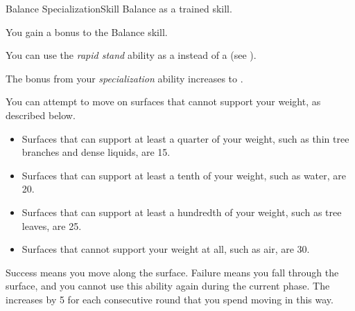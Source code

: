     \begin{feat}{Balance Specialization}{Skill}
        \featpre Balance as a trained skill.

         You gain a  bonus to the Balance skill.

         You can use the \textit{rapid stand} ability as a  instead of a  (see ).

         The bonus from your \textit{specialization} ability increases to .

         You can attempt to move on surfaces that cannot support your weight, as described below.
        \begin{itemize}
            \item Surfaces that can support at least a quarter of your weight, such as thin tree branches and dense liquids, are  15.
            \item Surfaces that can support at least a tenth of your weight, such as water, are  20.
            \item Surfaces that can support at least a hundredth of your weight, such as tree leaves, are  25.
            \item Surfaces that cannot support your weight at all, such as air, are  30.
        \end{itemize}

        Success means you move along the surface.
        Failure means you fall through the surface, and you cannot use this ability again during the current phase.
        The  increases by 5 for each consecutive round that you spend moving in this way.
    \end{feat}

